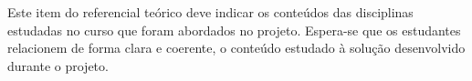 Este item do referencial teórico deve indicar os conteúdos das disciplinas estudadas
no curso que foram abordados no projeto. Espera-se que os estudantes relacionem de forma
clara e coerente, o conteúdo estudado à solução desenvolvido durante o projeto.
